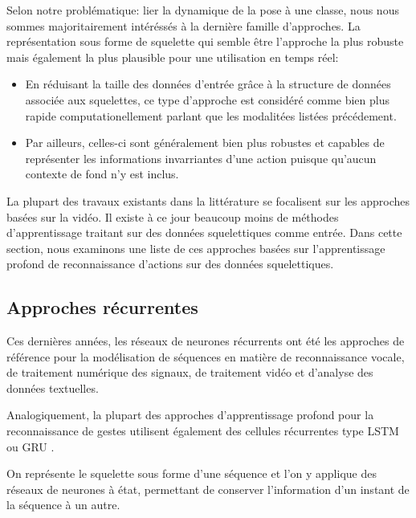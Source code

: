 Selon notre problématique: lier la dynamique de la pose à une classe, nous nous sommes majoritairement intéréssés à la dernière famille d'approches. La représentation sous forme de squelette qui semble être l'approche la plus robuste mais également la plus plausible pour une utilisation en temps réel:

\begin{itemize}
    \item En réduisant la taille des données d'entrée grâce à la structure de données associée aux squelettes, ce type d'approche est considéré comme bien plus rapide computationellement parlant que les modalitées listées précédement.
    \item Par ailleurs, celles-ci sont généralement bien plus robustes et capables de représenter les informations invarriantes d'une action puisque qu'aucun contexte de fond n'y est inclus.
\end{itemize}

La plupart des travaux existants dans la littérature se focalisent sur les approches basées sur la vidéo. Il existe à ce jour beaucoup moins de méthodes d'apprentissage traitant sur des données squelettiques comme entrée. Dans cette section, nous examinons une liste de ces approches basées sur l'apprentissage profond de reconnaissance d'actions sur des données squelettiques.

\subsection{Approches récurrentes}

Ces dernières années, les réseaux de neurones récurrents ont  été les approches de référence pour la modélisation de séquences en matière de reconnaissance vocale, de traitement numérique des signaux, de traitement vidéo et d'analyse des données textuelles. 


Analogiquement, la plupart des approches d'apprentissage profond pour la reconnaissance de gestes utilisent également des cellules récurrentes type LSTM \cite{hochreiter1997long} ou GRU \cite{2014arXiv1406.1078C}.

On représente le squelette sous forme d’une séquence et l'on y applique des réseaux de neurones à état, permettant de conserver l’information d’un instant de la séquence à un autre.


